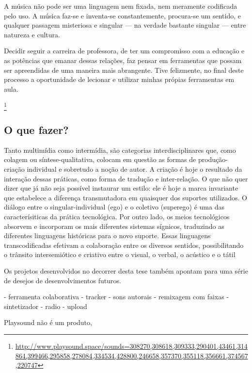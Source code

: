 \begin{citacao}
A música não pode ser uma linguagem nem fixada, nem meramente codificada pelo uso. A música faz-se e inventa-se constantemente, procura-se um sentido, e qualquer passagem misteriosa e singular — na verdade bastante singular — entre natureza e
cultura. \cite{Schaeffer2007}

Decidir seguir a carreira de professora, de ter um compromisso com a educação e as potências que emanar dessas relações, faz pensar em ferramentas que possam ser apreendidas de uma maneira mais abrangente. Tive felizmente, no final deste processo a oportunidade de lecionar e utilizar minhas própias ferramentas em aula.


\footnote{\url{http://www.playsound.space/sounds=308270,308618,309333,290401,43461,314864,399466,295858,278084,334534,428800,246658,357370,355118,356661,374567,220747}}









\subsection{O que fazer?} 

\begin{citacao}
Tanto multimídia como intermídia, são categorias interdisciplinares que, como colagem ou síntese-qualitativa, colocam em questão as formas de produção-criação individual e sobretudo a noção de autor. A criação é hoje o resultado da interação dessas práticas, como forma de tradução e inter-relação. O que não quer dizer que já não seja possível instaurar um estilo: ele é hoje a marca invariante que estabelece a diferença transmutadora em quaisquer dos suportes utilizados. O diálogo entre o singular-individual (ego) e o coletivo (superego) é uma das caracterísiticas da prática tecnológica. Por outro lado, os meios tecnológicos absorvem e incorporam os mais diferentes sistemas sígnicos, traduzindo as diferentes linguagens históricas para o novo suporte. Essas linguagens transcodificadas efetivam a colaboração entre os diversos sentidos, possibilitando o trânsito intersemiótico e criativo entre o visual, o verbal, o acústico e o tátil \cite[66]{JulioPlaza1969}
\end{citacao}

Os projetos desenvolvidos no decorrer desta tese também apontam para uma série de desejos de desenvolvimentos futuros. 

- ferramenta colaborativa
- tracker
- sons autorais
- remixagem com faixas 
- sintetizador
- radio
- upload

Playsound não é um produto, 




\end{citacao}

